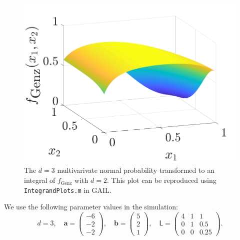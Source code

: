 \documentclass{iitthesis}          %
\newcommand{\bm}[1]{\boldsymbol{#1}}
\newcommand{\va}{\bm{a}}
\newcommand{\vb}{\bm{b}}
\newcommand{\mL}{\mathsf{L}}
\newcommand{\code}[1]{\texttt{#1}}
\begin{document}
\begin{figure}
	\centering
		\includegraphics[width=0.9\linewidth]{GenzFunc_varTx_none}
	\caption{The $d=3$ multivarivate normal probability transformed to an integral of $f_{\text{Genz}}$ with  $d=2$. This plot can be reproduced using \code{IntegrandPlots.m} in GAIL.}
	\label{fig:MVN_Genz}
\end{figure}

We use the following parameter values in the simulation: 
\begin{equation*}
d = 3, \quad \va = \begin{pmatrix}
-6 \\ -2 \\ -2
\end{pmatrix}, \quad 
\vb = \begin{pmatrix}
5 \\ 2 \\ 1
\end{pmatrix} , \quad 
\mL = \begin{pmatrix}
4 & 1 & 1 \\ 0 & 1 & 0.5 \\ 0 & 0 & 0.25
\end{pmatrix}.
\end{equation*}
\end{document}
